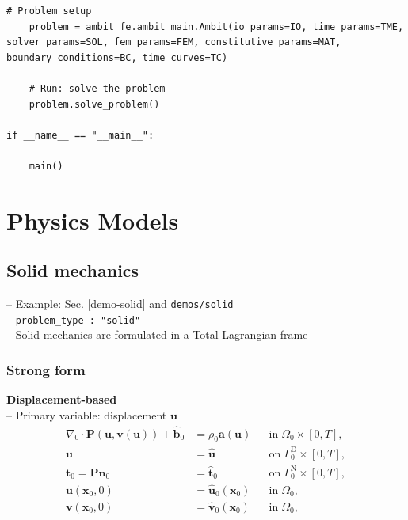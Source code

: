 \documentclass[a4paper,12pt]{report}
\newcommand{\bs}[1]{\boldsymbol{#1}}
\begin{document}
\begin{Verbatim}[breaklines=true]
    # Problem setup
    problem = ambit_fe.ambit_main.Ambit(io_params=IO, time_params=TME, solver_params=SOL, fem_params=FEM, constitutive_params=MAT, boundary_conditions=BC, time_curves=TC)

    # Run: solve the problem
    problem.solve_problem()
    
if __name__ == "__main__":

    main()
\end{Verbatim}

\section{Physics Models}\label{physics-models}

\subsection{Solid mechanics}\label{solid-mechanics}

-- Example: Sec. \ref{demo-solid} and \verb"demos/solid"\\

-- \verb.problem_type : "solid".\\

-- Solid mechanics are formulated in a Total Lagrangian frame

\subsubsection{Strong form}

\textbf{Displacement-based}\\

-- Primary variable: displacement $\bs{u}$
\begin{equation}
\label{equation-solid-strong-form}
\begin{aligned}
\nabla_{0} \cdot \bs{P}(\bs{u},\bs{v}(\bs{u})) + \hat{\bs{b}}_{0} &= \rho_{0} \bs{a}(\bs{u}) &&\text{in} \; \mathit{\Omega}_{0} \times [0, T], \\
\bs{u} &= \hat{\bs{u}} &&\text{on} \; \mathit{\Gamma}_{0}^{\mathrm{D}} \times [0, T],\\
\bs{t}_{0} = \bs{P}\bs{n}_{0} &= \hat{\bs{t}}_{0} &&\text{on} \; \mathit{\Gamma}_{0}^{\mathrm{N}} \times [0, T],\\
\bs{u}(\bs{x}_{0},0) &= \hat{\bs{u}}_{0}(\bs{x}_{0}) &&\text{in} \; \mathit{\Omega}_{0},\\
\bs{v}(\bs{x}_{0},0) &= \hat{\bs{v}}_{0}(\bs{x}_{0}) &&\text{in} \; \mathit{\Omega}_{0},
\end{aligned}
\end{equation}
\end{document}
